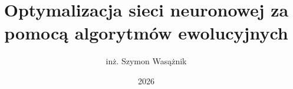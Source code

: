\documentclass[thesis=inz,faculty=ee]{EE-dyplom}
\author{%
  inż.
  Szymon Wasążnik%
}
\date{2026}
\title{%
  Optymalizacja sieci neuronowej
  za pomocą algorytmów ewolucyjnych%
}
\begin{document}
  \frontpages

  

  \bibliografia
  
  \acronymslist
\end{document}
